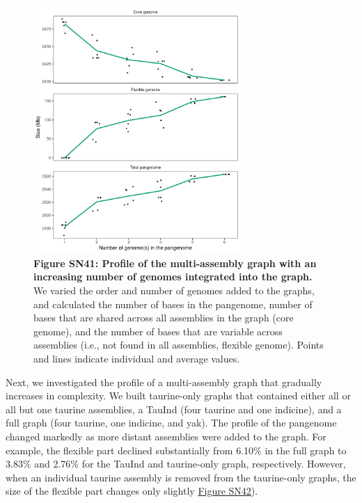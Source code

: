 \documentclass[../main.tex]{subfiles}
\begin{document}
\begin{flushleft}
\begin{figure}[!htb]
    \centering
    \includegraphics[width=0.7\textwidth]{paper3/supplement/sp415.pdf}
    \caption*{\textbf{\hypertarget{Figure SN41}{Figure SN41}: Profile of the multi-assembly graph with an increasing number of genomes integrated into the graph.} \\
    \footnotesize{We varied the order and number of genomes added to the graphs, and calculated the number of bases in the pangenome, number of bases that are shared across all assemblies in the graph (core genome), and the number of bases that are variable across assemblies (i.e., not found in all assemblies, flexible genome). Points and lines indicate individual and average values.}}
\end{figure}

\bigskip
Next, we investigated the profile of a multi-assembly graph that gradually increases in complexity. We built taurine-only graphs that contained either all or all but one taurine assemblies, a TauInd (four taurine and one indicine), and a full graph (four taurine, one indicine, and yak). The profile of the pangenome changed markedly as more distant assemblies were added to the graph. For example, the flexible part declined substantially from 6.10\% in the full graph to 3.83\% and 2.76\% for the TauInd and taurine-only graph, respectively. However, when an individual taurine assembly is removed from the taurine-only graphs, the size of the flexible part changes only slightly \hyperlink{Figure SN42}{Figure SN42}).


\end{flushleft}
\end{document}
